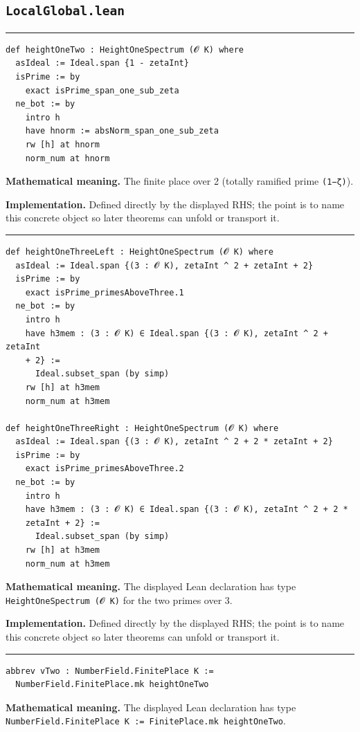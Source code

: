 \documentclass[UTF8,a4paper,11pt,fontset=fandol]{ctexart}
\theoremstyle{definition}
\newcommand{\statementsep}{\par\medskip\hrule\medskip}
\begin{document}
\subsection{\texttt{LocalGlobal.lean}}

\statementsep
\begin{verbatim}
def heightOneTwo : HeightOneSpectrum (𝓞 K) where
  asIdeal := Ideal.span {1 - zetaInt}
  isPrime := by
    exact isPrime_span_one_sub_zeta
  ne_bot := by
    intro h
    have hnorm := absNorm_span_one_sub_zeta
    rw [h] at hnorm
    norm_num at hnorm
\end{verbatim}
\noindent\textbf{Mathematical meaning.} The finite place over 2 (totally ramified prime \texttt{(1−ζ)}).\par
\noindent\textbf{Implementation.} Defined directly by the displayed RHS; the point is to name this concrete object so later theorems can unfold or transport it.\par
\statementsep
\begin{verbatim}
def heightOneThreeLeft : HeightOneSpectrum (𝓞 K) where
  asIdeal := Ideal.span {(3 : 𝓞 K), zetaInt ^ 2 + zetaInt + 2}
  isPrime := by
    exact isPrime_primesAboveThree.1
  ne_bot := by
    intro h
    have h3mem : (3 : 𝓞 K) ∈ Ideal.span {(3 : 𝓞 K), zetaInt ^ 2 + zetaInt
    + 2} :=
      Ideal.subset_span (by simp)
    rw [h] at h3mem
    norm_num at h3mem

def heightOneThreeRight : HeightOneSpectrum (𝓞 K) where
  asIdeal := Ideal.span {(3 : 𝓞 K), zetaInt ^ 2 + 2 * zetaInt + 2}
  isPrime := by
    exact isPrime_primesAboveThree.2
  ne_bot := by
    intro h
    have h3mem : (3 : 𝓞 K) ∈ Ideal.span {(3 : 𝓞 K), zetaInt ^ 2 + 2 *
    zetaInt + 2} :=
      Ideal.subset_span (by simp)
    rw [h] at h3mem
    norm_num at h3mem
\end{verbatim}
\noindent\textbf{Mathematical meaning.} The displayed Lean declaration has type \texttt{HeightOneSpectrum (𝓞 K)} for the two primes over 3.\par
\noindent\textbf{Implementation.} Defined directly by the displayed RHS; the point is to name this concrete object so later theorems can unfold or transport it.\par
\statementsep
\begin{verbatim}
abbrev vTwo : NumberField.FinitePlace K :=
  NumberField.FinitePlace.mk heightOneTwo
\end{verbatim}
\noindent\textbf{Mathematical meaning.} The displayed Lean declaration has type \texttt{NumberField.\allowbreak{}FinitePlace K := FinitePlace.\allowbreak{}mk heightOneTwo}.\par
\end{document}
